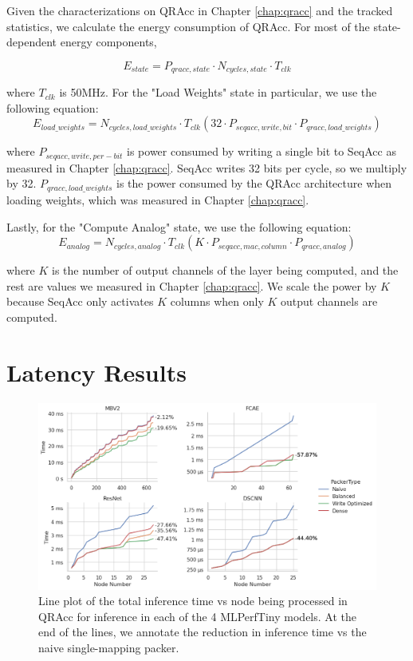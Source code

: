 Given the characterizations on QRAcc in Chapter \ref{chap:qracc} and the tracked statistics, we calculate the energy consumption of QRAcc. For most of the state-dependent energy components, 

\begin{equation}
    E_{state} = P_{qracc,state}\cdot N_{cycles,state}\cdot T_{clk}
\end{equation}

where $T_{clk}$ is 50MHz. For the "Load Weights" state in particular, we use the following equation:
\begin{equation}
    E_{load\_weights} = N_{cycles,load\_weights}\cdot T_{clk}(32\cdot P_{seqacc,write,bit}\cdot P_{qracc,load\_weights})
\end{equation}

where $P_{seqacc,write,per-bit}$ is power consumed by writing a single bit to SeqAcc as measured in Chapter \ref{chap:qracc}. SeqAcc writes 32 bits per cycle, so we multiply by 32. $P_{qracc,load\_weights}$ is the power consumed by the QRAcc architecture when loading weights, which was measured in Chapter \ref{chap:qracc}.

Lastly, for the "Compute Analog" state, we use the following equation:
\begin{equation}
    E_{analog} = N_{cycles,analog}\cdot T_{clk}(K\cdot P_{seqacc,mac,column}\cdot P_{qracc,analog})
\end{equation}

where $K$ is the number of output channels of the layer being computed, and the rest are values we measured in Chapter \ref{chap:qracc}. We scale the power by $K$ because SeqAcc only activates $K$ columns when only $K$ output channels are computed. 

\section{Latency Results}

\begin{figure}[htbp]
    \centering
    \includegraphics[width=\textwidth]{images/marp_qracc/timeline.png}
    \caption{Line plot of the total inference time vs node being processed in QRAcc for inference in each of the 4 MLPerfTiny models. At the end of the lines, we annotate the reduction in inference time vs the naive single-mapping packer.}
    \label{fig:timeline}
\end{figure}

